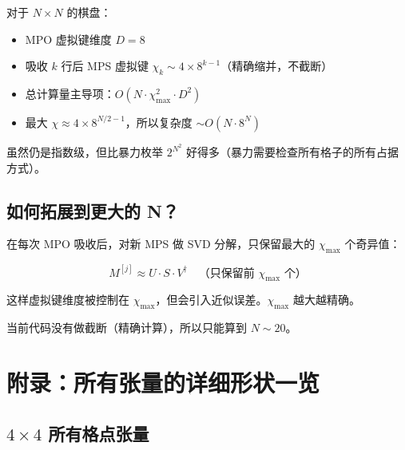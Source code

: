 \documentclass[12pt,a4paper]{article}
\begin{document}
对于 $N \times N$ 的棋盘：
\begin{itemize}
  \item MPO 虚拟键维度 $D = 8$
  \item 吸收 $k$ 行后 MPS 虚拟键 $\chi_k \sim 4 \times 8^{k-1}$（精确缩并，不截断）
  \item 总计算量主导项：$O(N \cdot \chi_{\max}^2 \cdot D^2)$
  \item 最大 $\chi \approx 4 \times 8^{N/2-1}$，所以复杂度 $\sim O(N \cdot 8^N)$
\end{itemize}

虽然仍是指数级，但比暴力枚举 $2^{N^2}$ 好得多（暴力需要检查所有格子的所有占据方式）。

\subsection{如何拓展到更大的 N？}

\begin{keybox}
在每次 MPO 吸收后，对新 MPS 做 SVD 分解，只保留最大的 $\chi_{\max}$ 个奇异值：

$$M^{[j]} \approx U \cdot S \cdot V^\dagger \quad \text{（只保留前 $\chi_{\max}$ 个）}$$

这样虚拟键维度被控制在 $\chi_{\max}$，但会引入近似误差。$\chi_{\max}$ 越大越精确。

当前代码没有做截断（精确计算），所以只能算到 $N \sim 20$。
\end{keybox}


\section{附录：所有张量的详细形状一览}

\subsection{$4 \times 4$ 所有格点张量}
\end{document}
